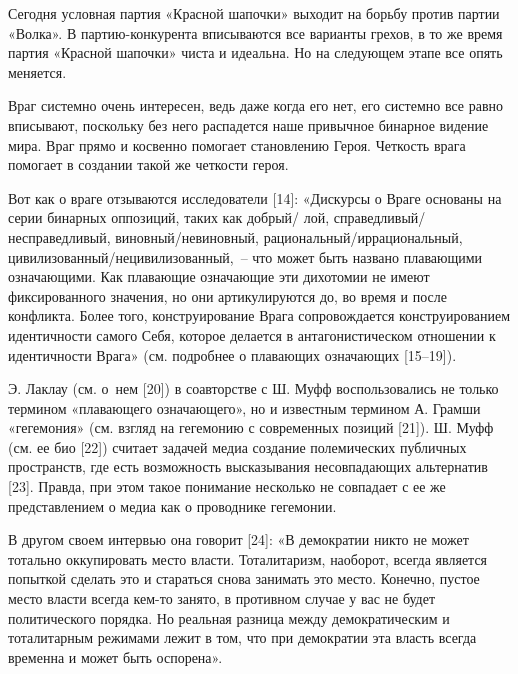 Сегодня условная партия «Красной шапочки» выходит на борьбу против партии
«Волка». В партию-конкурента вписываются все варианты грехов, в то же время
партия «Красной шапочки» чиста и идеальна. Но на следующем этапе все опять
меняется.

Враг системно очень интересен, ведь даже когда его нет, его системно все равно
вписывают, поскольку без него распадется наше привычное бинарное видение мира.
Враг прямо и косвенно помогает становлению Героя. Четкость врага помогает в
создании такой же четкости героя.

Вот как о враге отзываются исследователи [14]: «Дискурсы о Враге основаны на
серии бинарных оппозиций, таких как добрый/ лой, справедливый/несправедливый,
виновный/невиновный, рациональный/иррациональный,
цивилизованный/нецивилизованный, – что может быть названо плавающими
означающими. Как плавающие означающие эти дихотомии не имеют фиксированного
значения, но они артикулируются до, во время и после конфликта. Более того,
конструирование Врага сопровождается конструированием идентичности самого Себя,
которое делается в антагонистическом отношении к идентичности Врага» (см.
подробнее о плавающих означающих [15–19]).

Э. Лаклау (см. о нем [20]) в соавторстве с Ш. Муфф воспользовались не только
термином «плавающего означающего», но и известным термином А. Грамши
«гегемония» (см. взгляд на гегемонию с современных позиций [21]). Ш. Муфф (см.
ее био [22]) считает задачей медиа создание полемических публичных пространств,
где есть возможность высказывания несовпадающих альтернатив [23]. Правда, при
этом такое понимание несколько не совпадает с ее же представлением о медиа как
о проводнике гегемонии.

В другом своем интервью она говорит [24]: «В демократии никто не может тотально
оккупировать место власти. Тоталитаризм, наоборот, всегда является попыткой
сделать это и стараться снова занимать это место. Конечно, пустое место власти
всегда кем-то занято, в противном случае у вас не будет политического порядка.
Но реальная разница между демократическим и тоталитарным режимами лежит в том,
что при демократии эта власть всегда временна и может быть оспорена».
